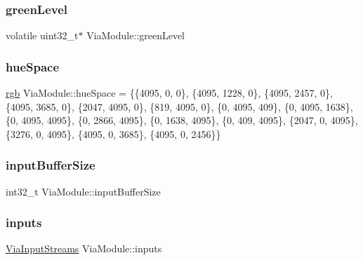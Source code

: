 \subsubsection{\texorpdfstring{green\+Level}{greenLevel}\hspace{0.1cm}{\footnotesize\ttfamily [2/2]}}
{\footnotesize\ttfamily volatile uint32\+\_\+t$\ast$ Via\+Module\+::green\+Level}

\mbox{\label{class_via_module_a3426e2c19cee84ade2831cae4b627ebb}} 
\subsubsection{\texorpdfstring{hue\+Space}{hueSpace}}
{\footnotesize\ttfamily \mbox{\hyperlink{structrgb}{rgb}} Via\+Module\+::hue\+Space = \{\{4095, 0, 0\}, \{4095, 1228, 0\}, \{4095, 2457, 0\}, \{4095, 3685, 0\}, \{2047, 4095, 0\}, \{819, 4095, 0\}, \{0, 4095, 409\}, \{0, 4095, 1638\}, \{0, 4095, 4095\}, \{0, 2866, 4095\}, \{0, 1638, 4095\}, \{0, 409, 4095\}, \{2047, 0, 4095\}, \{3276, 0, 4095\}, \{4095, 0, 3685\}, \{4095, 0, 2456\}\}}

\mbox{\label{class_via_module_a23de5840e07f0b427bda2d44d116287f}} 
\subsubsection{\texorpdfstring{input\+Buffer\+Size}{inputBufferSize}}
{\footnotesize\ttfamily int32\+\_\+t Via\+Module\+::input\+Buffer\+Size}

\mbox{\label{class_via_module_af04f1c8df2a0302a9364dfb99a9085dc}} 
\subsubsection{\texorpdfstring{inputs}{inputs}}
{\footnotesize\ttfamily \mbox{\hyperlink{class_via_input_streams}{Via\+Input\+Streams}} Via\+Module\+::inputs}

\mbox{\label{class_via_module_a8bbc2b1b6b811030a29c54eb2267402d}} 
